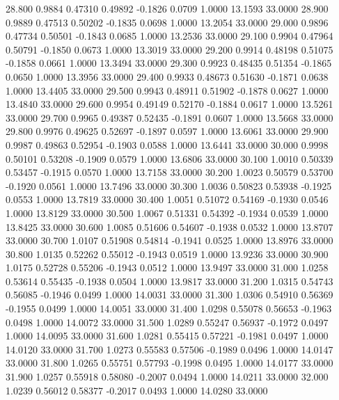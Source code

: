   28.800   0.9884   0.47310   0.49892  -0.1826   0.0709   1.0000  13.1593  33.0000
  28.900   0.9889   0.47513   0.50202  -0.1835   0.0698   1.0000  13.2054  33.0000
  29.000   0.9896   0.47734   0.50501  -0.1843   0.0685   1.0000  13.2536  33.0000
  29.100   0.9904   0.47964   0.50791  -0.1850   0.0673   1.0000  13.3019  33.0000
  29.200   0.9914   0.48198   0.51075  -0.1858   0.0661   1.0000  13.3494  33.0000
  29.300   0.9923   0.48435   0.51354  -0.1865   0.0650   1.0000  13.3956  33.0000
  29.400   0.9933   0.48673   0.51630  -0.1871   0.0638   1.0000  13.4405  33.0000
  29.500   0.9943   0.48911   0.51902  -0.1878   0.0627   1.0000  13.4840  33.0000
  29.600   0.9954   0.49149   0.52170  -0.1884   0.0617   1.0000  13.5261  33.0000
  29.700   0.9965   0.49387   0.52435  -0.1891   0.0607   1.0000  13.5668  33.0000
  29.800   0.9976   0.49625   0.52697  -0.1897   0.0597   1.0000  13.6061  33.0000
  29.900   0.9987   0.49863   0.52954  -0.1903   0.0588   1.0000  13.6441  33.0000
  30.000   0.9998   0.50101   0.53208  -0.1909   0.0579   1.0000  13.6806  33.0000
  30.100   1.0010   0.50339   0.53457  -0.1915   0.0570   1.0000  13.7158  33.0000
  30.200   1.0023   0.50579   0.53700  -0.1920   0.0561   1.0000  13.7496  33.0000
  30.300   1.0036   0.50823   0.53938  -0.1925   0.0553   1.0000  13.7819  33.0000
  30.400   1.0051   0.51072   0.54169  -0.1930   0.0546   1.0000  13.8129  33.0000
  30.500   1.0067   0.51331   0.54392  -0.1934   0.0539   1.0000  13.8425  33.0000
  30.600   1.0085   0.51606   0.54607  -0.1938   0.0532   1.0000  13.8707  33.0000
  30.700   1.0107   0.51908   0.54814  -0.1941   0.0525   1.0000  13.8976  33.0000
  30.800   1.0135   0.52262   0.55012  -0.1943   0.0519   1.0000  13.9236  33.0000
  30.900   1.0175   0.52728   0.55206  -0.1943   0.0512   1.0000  13.9497  33.0000
  31.000   1.0258   0.53614   0.55435  -0.1938   0.0504   1.0000  13.9817  33.0000
  31.200   1.0315   0.54743   0.56085  -0.1946   0.0499   1.0000  14.0031  33.0000
  31.300   1.0306   0.54910   0.56369  -0.1955   0.0499   1.0000  14.0051  33.0000
  31.400   1.0298   0.55078   0.56653  -0.1963   0.0498   1.0000  14.0072  33.0000
  31.500   1.0289   0.55247   0.56937  -0.1972   0.0497   1.0000  14.0095  33.0000
  31.600   1.0281   0.55415   0.57221  -0.1981   0.0497   1.0000  14.0120  33.0000
  31.700   1.0273   0.55583   0.57506  -0.1989   0.0496   1.0000  14.0147  33.0000
  31.800   1.0265   0.55751   0.57793  -0.1998   0.0495   1.0000  14.0177  33.0000
  31.900   1.0257   0.55918   0.58080  -0.2007   0.0494   1.0000  14.0211  33.0000
  32.000   1.0239   0.56012   0.58377  -0.2017   0.0493   1.0000  14.0280  33.0000
